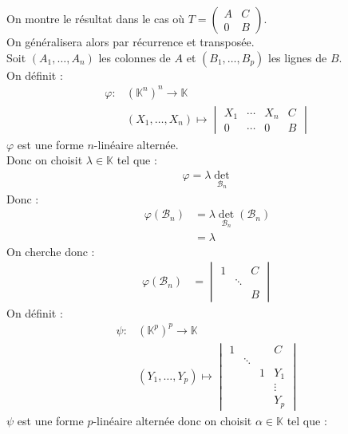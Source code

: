 \documentclass[../main.tex]{subfiles}
\begin{document}
\noindent On montre le résultat dans le cas où $T = \begin{pmatrix}
    A & C \\
    0 & B
\end{pmatrix}$. \\
On généralisera alors par récurrence et transposée. \\
Soit $(A_1, \ldots, A_n)$ les colonnes de $A$ et $(B_1, \ldots, B_p)$ les lignes de $B$. \\
On définit : 
\begin{align*}
    \varphi:&(\mathbb{K}^n)^n \to \mathbb{K} \\
    &(X_1, \ldots, X_n) \mapsto \begin{vmatrix}
        X_1 & \cdots & X_n & C \\
        0 & \cdots & 0 & B
    \end{vmatrix}
\end{align*}
$\varphi$ est une forme $n$-linéaire alternée. \\
Donc on choisit $\lambda\in \mathbb{K}$ tel que : 
\begin{align*}
    \varphi = \lambda \operatorname{det}_{\mathcal{B}_n}
\end{align*}
Donc : 
\begin{align*}
    \varphi(\mathcal{B}_n) &= \lambda \operatorname{det}_{\mathcal{B}_n}(\mathcal{B}_n) \\
    &= \lambda
\end{align*}
On cherche donc : 
\begin{align*}
    \varphi(\mathcal{B}_n) &= \begin{vmatrix}
        1 & & C \\
        & \ddots & \\
        & & B
    \end{vmatrix}
\end{align*}
On définit : 
\begin{align*}
    \psi:&(\mathbb{K}^p)^p \to \mathbb{K} \\
    &(Y_1, \ldots, Y_p) \mapsto \begin{vmatrix}
        1 & & & C \\
        & \ddots & & \\
        & & 1 & Y_1 \\
        & & & \vdots \\
        & & & Y_p
    \end{vmatrix}
\end{align*}
$\psi$ est une forme $p$-linéaire alternée donc on choisit $\alpha\in \mathbb{K}$ tel que : 
\end{document}
